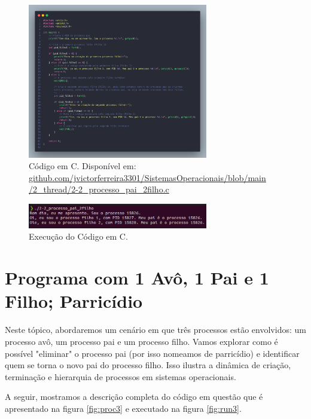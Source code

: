 \documentclass[
	12pt,				%
	openright,			%
	oneside,			%
	a4paper,			%
	chapter=TITLE,		%
	english,			%
	french,				%
	spanish,			%
	brazil				%
	]{abntex2}
\theoremstyle{definition}
\begin{document}
\begin{figure}
    \centering
    \includegraphics[width=0.7\textwidth]{imagens/processos_2.png}
    \caption{Código em C. Disponível em: \href{https://github.com/jvictorferreira3301/Sistemas_Operacionais/blob/main/2_thread/2-2_processo_pai_2filho.c}{github.com/jvictorferreira3301/SistemasOperacionais/blob/main
    /2\_thread/2-2\_processo\_pai\_2filho.c}}
    \label{fig:proc2}
\end{figure}

\begin{figure}
    \centering
    \includegraphics[width=0.7\textwidth]{imagens/run_processos_2.png}
    \caption{Execução do Código em C.}
    \label{fig:run2}
\end{figure}

\section{Programa com 1 Avô, 1 Pai e 1 Filho; Parricídio}

Neste tópico, abordaremos um cenário em que três processos estão 
envolvidos: um processo avô, um processo pai e um processo filho.
Vamos explorar como é possível "eliminar" o processo pai (por isso nomeamos de parricídio)
e identificar quem se torna o novo pai do processo filho. Isso ilustra a dinâmica de 
criação, terminação e hierarquia de processos em sistemas operacionais.

A seguir, mostramos a descrição completa do código em questão que é
apresentado na figura \ref{fig:proc3} e executado na figura \ref{fig:run3}.
\end{document}
